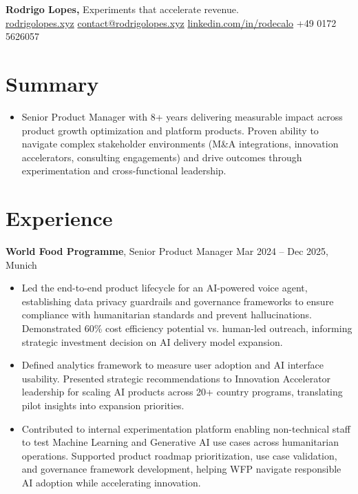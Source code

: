 \documentclass[11pt,a4paper]{article}
\begin{document}
\begin{center}
  {\Huge\bfseries Rodrigo Lopes,} {\small Experiments that accelerate revenue.}\\[6pt]
  \href{https://rodrigolopes.xyz/?utm_source=resume&utm_medium=pdf}{rodrigolopes.xyz} \textbar{}
  \href{mailto:contact@rodrigolopes.xyz}{contact@rodrigolopes.xyz} \textbar{}
  \href{https://www.linkedin.com/in/rodecalo/}{linkedin.com/in/rodecalo} \textbar{}
  +49 0172 5626057
\end{center}

\vspace{8pt}

\section*{Summary}
\begin{itemize}[leftmargin=*, label=$\bullet$, itemsep=0pt, parsep=4pt]
\item Senior Product Manager with 8+ years delivering measurable impact across product growth optimization and platform products. Proven ability to navigate complex stakeholder environments (M\&A integrations, innovation accelerators, consulting engagements) and drive outcomes through experimentation and cross-functional leadership.
\end{itemize}

\vspace{6pt}

\section*{Experience}
\vspace{4pt}

\noindent\textbf{World Food Programme}, Senior Product Manager \hfill Mar 2024 – Dec 2025, Munich
\begin{itemize}[leftmargin=*, label=$\bullet$, itemsep=4pt, parsep=0pt]
\item Led the end-to-end product lifecycle for an AI-powered voice agent, establishing data privacy guardrails and governance frameworks to ensure compliance with humanitarian standards and prevent hallucinations. Demonstrated 60\% cost efficiency potential vs. human-led outreach, informing strategic investment decision on AI delivery model expansion.

\item Defined analytics framework to measure user adoption and AI interface usability. Presented strategic recommendations to Innovation Accelerator leadership for scaling AI products across 20+ country programs, translating pilot insights into expansion priorities.

\item Contributed to internal experimentation platform enabling non-technical staff to test Machine Learning and Generative AI use cases across humanitarian operations. Supported product roadmap prioritization, use case validation, and governance framework development, helping WFP navigate responsible AI adoption while accelerating innovation.
\end{itemize}
\end{document}
